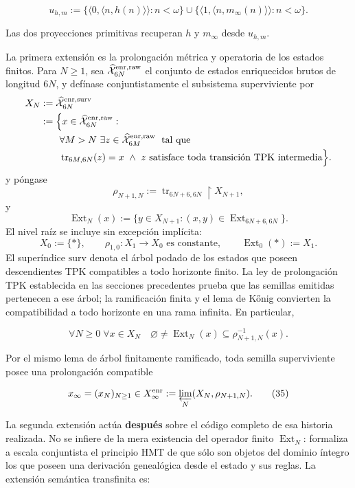\[
 u_{h,m}:=
 \{\langle0,\langle n,h(n)\rangle\rangle:n<\omega\}
 \cup
 \{\langle1,\langle n,m_\infty(n)\rangle\rangle:n<\omega\}.
\tag{33a}\label{hmtfg:base:eq:ch-codigo-conjunto}
\]

Las dos proyecciones primitivas recuperan \(h\) y \(m_\infty\) desde
\(u_{h,m}\).

La primera extensión es la prolongación métrica y operatoria de los estados
finitos. Para \(N\ge1\), sea
\(\widehat{\mathcal X}^{\rm enr,raw}_{6N}\) el conjunto de estados
enriquecidos brutos de longitud \(6N\), y defínase conjuntistamente el
subsistema superviviente por
\[
\begin{aligned}
 X_N
 &:=\widehat{\mathcal X}^{\rm enr,surv}_{6N}\\
 &:=\Bigl\{x\in\widehat{\mathcal X}^{\rm enr,raw}_{6N}:\\[-.2ex]
 &\qquad\forall M>N\ \exists z\in
   \widehat{\mathcal X}^{\rm enr,raw}_{6M}\;\text{ tal que}\\[-.2ex]
 &\qquad\operatorname{tr}_{6M,6N}(z)=x\ \wedge\
   z\text{ satisface toda transición TPK intermedia}\Bigr\}.
\end{aligned}
\]
y póngase
\[
 \rho_{N+1,N}:=\operatorname{tr}_{6N+6,6N}\!\upharpoonright X_{N+1},
\]
y
\[
 \operatorname{Ext}_N(x):=
 \{y\in X_{N+1}:(x,y)\in
 \operatorname{Ext}_{6N+6,6N}\}.
\]
El nivel raíz se incluye sin excepción implícita:
\[
 X_0:=\{\ast\},\qquad
 \rho_{1,0}:X_1\to X_0\text{ es constante},\qquad
 \operatorname{Ext}_0(\ast):=X_1.
\]
El superíndice \(\mathrm{surv}\) denota el
árbol podado de los estados que poseen descendientes TPK compatibles a todo
horizonte finito. La ley de prolongación TPK establecida en las secciones
precedentes prueba que las semillas
emitidas pertenecen a ese árbol; la ramificación finita y el lema de Kőnig
convierten la compatibilidad a todo horizonte en una rama infinita. En
particular,

\[
 \forall N\ge0\;\forall x\in X_N\quad
 \varnothing\ne\operatorname{Ext}_N(x)
 \subseteq\rho_{N+1,N}^{-1}(x).
\tag{34}\label{hmtfg:base:eq:ch-extension-no-vacia}
\]

Por el mismo lema de árbol finitamente ramificado, toda semilla superviviente
posee una prolongación compatible

\[
 x_\infty=(x_N)_{N\ge1}\in
 X_\infty^{\rm enr}:=\varprojlim_N(X_N,\rho_{N+1,N}).
\tag{35}\label{hmtfg:base:eq:ch-limite-inverso}
\]

La segunda extensión actúa \textbf{después} sobre el código completo de esa
historia realizada.
No se infiere de la mera existencia del operador finito
\(\operatorname{Ext}_N\): formaliza a escala conjuntista el principio HMT de
que sólo son objetos del dominio íntegro los que poseen una derivación
genealógica desde el estado y sus reglas. La extensión semántica transfinita
es:

